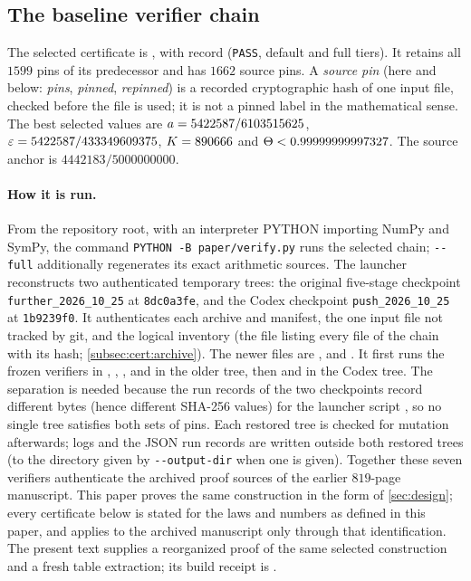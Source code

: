 \subsection{The baseline verifier chain}\label{subsec:cert:final}

The selected certificate is , with
record  (\texttt{PASS},
default and full tiers). It retains all $1599$ pins of its predecessor
and has $1662$ source pins. A \emph{source pin} (here and
below: \emph{pins}, \emph{pinned}, \emph{repinned}) is a
recorded cryptographic hash of one input file, checked before
the file is used; it is not a pinned label in the mathematical
sense. The best selected values are
$a=5422587/6103515625$, $\varepsilon=5422587/433349609375$, $K=890666$ and
$\Theta<0.99999999997327$. The source anchor is $4442183/5000000000$.

\begingroup\sloppy
\paragraph{How it is run.}
From the repository root, with an interpreter PYTHON importing NumPy and
SymPy, the command \texttt{PYTHON -B paper/verify.py} runs the selected chain;
\texttt{-{}-full} additionally regenerates its exact arithmetic sources.
The launcher reconstructs two authenticated temporary trees: the original
five-stage checkpoint \texttt{further\_2026\_10\_25} at \texttt{8dc0a3fe},
and the Codex checkpoint \texttt{push\_2026\_10\_25} at \texttt{1b9239f0}.
It authenticates each archive and manifest, the one input file not
tracked by git, and the logical inventory (the file listing every
file of the chain with its hash; \cref{subsec:cert:archive}). The newer files are
,
 and
.
It first runs the frozen verifiers in
, ,
, 
and  in the older tree, then
 and
 in the Codex tree. The separation is needed
because the run records of the two checkpoints record different
bytes (hence different SHA-256 values) for the launcher script
, so no single tree satisfies
both sets of pins. Each restored tree
is checked for mutation afterwards; logs and the JSON run records
are written outside both restored trees (to the directory given by
\texttt{-{}-output-dir} when one is given).
Together these seven verifiers authenticate the archived proof
sources of the earlier $819$-page manuscript. This paper proves
the same construction in the form of \cref{sec:design}; every
certificate below is stated for the laws and numbers as defined
in this paper, and applies to the archived manuscript only
through that identification. The present text supplies a
reorganized proof of the same selected
construction and a fresh table extraction; its build receipt is
.

